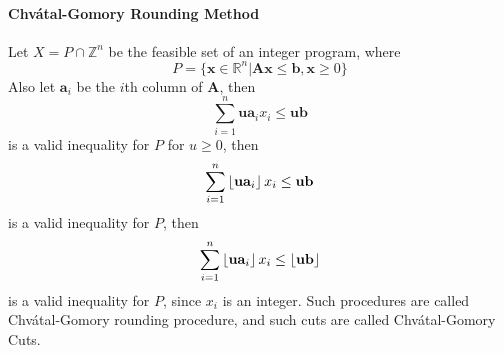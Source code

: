                \paragraph{Chv\'atal-Gomory Rounding Method}
                    Let $X = P \cap \mathbb{Z}^n$ be the feasible set of an integer program, where
                    \begin{equation*}
                        P = \{\mathbf{x} \in \mathbb{R}^n | \mathbf{Ax}\le \mathbf{b}, \mathbf{x} \ge 0\}
                    \end{equation*}
                    Also let $\mathbf{a}_i$ be the $i$th column of $\mathbf{A}$, then
                    \begin{equation*}
                        \sum_{i = 1}^n \mathbf{u} \mathbf{a}_i x_i \le \mathbf{ub}
                    \end{equation*}
                    is a valid inequality for $P$ for $u \ge 0$, then
                    \begin{equation*}
                        \sum_{i = 1}^n \left\lfloor \mathbf{u} \mathbf{a}_i \right\rfloor x_i \le \mathbf{ub}
                    \end{equation*}
                    is a valid inequality for $P$, then
                    \begin{equation*}
                        \sum_{i = 1}^n \left\lfloor \mathbf{u} \mathbf{a}_i \right\rfloor x_i \le \left\lfloor \mathbf{ub} \right\rfloor
                    \end{equation*}
                    is a valid inequality for $P$, since $x_i$ is an integer. Such procedures are called Chv\'atal-Gomory rounding procedure, and such cuts are called Chv\'atal-Gomory Cuts.

